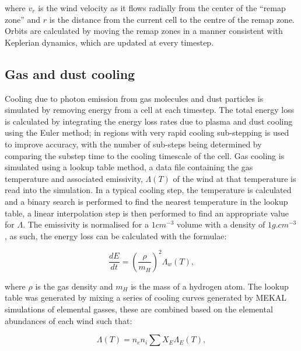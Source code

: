
where $v_r$ is the wind velocity as it flows radially from the center of the ``remap zone'' and $r$ is the distance from the current cell to the centre of the remap zone.
Orbits are calculated by moving the remap zones in a manner consistent with Keplerian dynamics, which are updated at every timestep.


\subsection{Gas and dust cooling} \label{sec:gas-dust-cooling}

Cooling due to photon emission from gas molecules and dust particles is simulated by removing energy from a cell at each timestep.
The total energy loss is calculated by integrating the energy loss rates due to plasma and dust cooling using the Euler method; in regions with very rapid cooling sub-stepping is used to improve accuracy, with the number of sub-steps being determined by comparing the substep time to the cooling timescale of the cell.
Gas cooling is simulated using a lookup table method, a data file containing the gas temperature and associated emissivity, $\Lambda(T)$ of the wind at that temperature is read into the simulation.
In a typical cooling step, the temperature is calculated and a binary search is performed to find the nearest temperature in the lookup table, a linear interpolation step is then performed to find an appropriate value for $\Lambda$.
The emissivity is normalised for a $1 \si{cm^{-3}}$ volume with a density of $1 \si{g.cm^{-3}}$, as such, the energy loss can be calculated with the formulae:

\begin{equation}
  \frac{dE}{dt} = \left(\frac{\rho}{m_H}\right)^2 \Lambda_w(T),
\end{equation}

where $\rho$ is the gas density and $m_H$ is the mass of a hydrogen atom.
The lookup table was generated by mixing a series of cooling curves generated by MEKAL simulations of elemental gasses, these are combined based on the elemental abundances of each wind such that:

\begin{equation}
  \Lambda(T) = n_e n_i \sum{X_E \Lambda_{E}(T)},
\end{equation}

